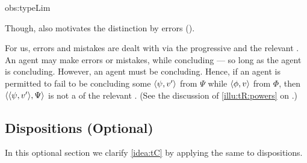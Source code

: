 \begin{note}
\begin{motivation}{obs:typeLim}
{    Though, \citeauthor{Chomsky:2015aa} also motivates the distinction by errors (\citeyear[2]{Chomsky:2015aa}).

    For us, errors and mistakes are dealt with via the progressive and the relevant \torN{}.
    An agent may make errors or mistakes, while concluding --- so long as the agent is concluding.
    However, an agent must be concluding.
    Hence, if an agent is permitted to fail to be concluding some \(\langle \psi, v' \rangle\) from \(\Psi\) while \tCV{} \(\langle \phi, v \rangle\) from \(\Phi\), then \(\langle \langle \psi, v' \rangle, \Psi \rangle\) is not a \tI{} of the relevant \torNa{}.
    (See the discussion of \autoref{illu:tR:powers} on .)
}
  \end{motivation}

\end{note}


\subsection[Dispositions]{Dispositions \hfill (Optional)}
\label{sec:dispositions}

\begin{note}
  In this optional section we clarify \autoref{idea:tC} by applying the same to dispositions.
\end{note}

